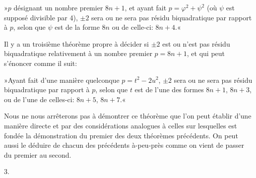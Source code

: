 \documentclass[11pt]{article}
\newcommand{\unitid}[1]{\hypertarget{#1}{}}
\begin{document}
\unitid{dirichlet.v1.p04a.thm.004}»$p$ désignant un nombre premier $8n+1$, et ayant fait $p=\varphi^2+\psi^2$ (où $\psi$ est supposé divisible par 4), $\pm2$ sera ou ne sera pas résidu biquadratique par rapport à $p$, selon que $\psi$ est de la forme $8n$ ou de celle-ci: $8n+4$.«

\unitid{dirichlet.v1.p04a.par.016}Il y a un troisième théorème propre à décider si $\pm2$ est ou n'est pas résidu biquadratique relativement à un nombre premier $p=8n+1$, et qui peut s'énoncer comme il suit:

\unitid{dirichlet.v1.p04a.thm.005}»Ayant fait d'une manière quelconque $p=t^2-2u^2$, $\pm2$ sera ou ne sera pas résidu biquadratique par rapport à $p$, selon que $t$ est de l'une des formes $8n+1$, $8n+3$, ou de l'une de celles-ci: $8n+5$, $8n+7$.«

\unitid{dirichlet.v1.p04a.par.017}Nous ne nous arrêterons pas à démontrer ce théorème que l'on peut établir d'une manière directe et par des considérations analogues à celles sur lesquelles est fondée la démonstration du premier des deux théorèmes précédents. On peut aussi le déduire de chacun des précédents à-peu-près comme on vient de passer du premier au second.

\begin{center}3.\end{center}
\end{document}
